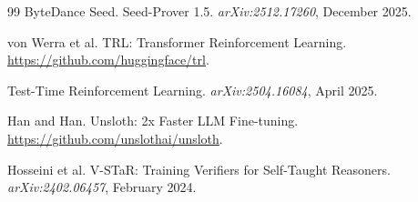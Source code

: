 \documentclass[11pt,a4paper]{article}
\begin{document}
\begin{thebibliography}{99}
ByteDance Seed.
\newblock Seed-Prover 1.5.
\newblock \emph{arXiv:2512.17260}, December 2025.

von Werra et al.
\newblock TRL: Transformer Reinforcement Learning.
\newblock \url{https://github.com/huggingface/trl}.

Test-Time Reinforcement Learning.
\newblock \emph{arXiv:2504.16084}, April 2025.

Han and Han.
\newblock Unsloth: 2x Faster LLM Fine-tuning.
\newblock \url{https://github.com/unslothai/unsloth}.

Hosseini et al.
\newblock V-STaR: Training Verifiers for Self-Taught Reasoners.
\newblock \emph{arXiv:2402.06457}, February 2024.

\end{thebibliography}
\end{document}

